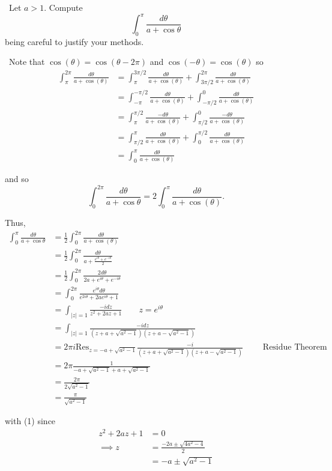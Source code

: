 \documentclass[12pt]{Homework}
\newcommand{\res}{\text{Res}}
\begin{document}
\begin{problem} $\,$
Let $a>1$. Compute $$\int_0^\pi\frac{d\theta}{a+\cos\theta}$$ being careful to justify your methods.
\end{problem}


\begin{solution}$\,$
Note that $\cos(\theta)=\cos(\theta-2\pi)$ and $\cos(-\theta)=\cos(\theta)$ so \begin{align*}
   \int_\pi^{2\pi}\frac{d\theta}{a+\cos(\theta)}&=\int_\pi^{3\pi/2}\frac{d\theta}{a+\cos(\theta)}+\int_{3\pi/2}^{2\pi}\frac{d\theta}{a+\cos(\theta)}\\
   &=\int_{-\pi}^{-\pi/2}\frac{d\theta}{a+\cos(\theta)}+\int_{-\pi/2}^0\frac{d\theta}{a+\cos(\theta)}\\
   &=\int_{\pi}^{\pi/2}\frac{-d\theta}{a+\cos(\theta)}+\int_{\pi/2}^0\frac{-d\theta}{a+\cos(\theta)}\\
   &=\int_{\pi/2}^{\pi}\frac{d\theta}{a+\cos(\theta)}+\int_0^{\pi/2}\frac{d\theta}{a+\cos(\theta)}\\
   &=\int_0^{\pi}\frac{d\theta}{a+\cos(\theta)}
\end{align*}

and so $$\int_0^{2\pi}\frac{d\theta}{a+\cos\theta}=2\int_0^\pi\frac{d\theta}{a+\cos(\theta)}.$$

Thus, \begin{align*}
    \int_0^\pi\frac{d\theta}{a+\cos\theta}&=\frac{1}{2}\int_0^{2\pi}\frac{d\theta}{a+\cos(\theta)}\\
    &=\frac{1}{2}\int_0^{2\pi}\frac{d\theta}{a+\frac{e^{i\theta}+e^{-i\theta}}{2}}\\
    &=\frac{1}{2}\int_0^{2\pi}\frac{2d\theta}{2a+e^{i\theta}+e^{-i\theta}}\\
    &=\int_0^{2\pi}\frac{e^{i\theta}d\theta}{e^{2i\theta}+2ae^{i\theta}+1}\\
    &=\int_{|z|=1}\frac{-idz}{z^2+2az+1}\qquad z=e^{i\theta}\\
    &=\int_{|z|=1}\frac{-idz}{(z+a+\sqrt{a^2-1})(z+a-\sqrt{a^2-1})}\tag{1}\\
    &=2\pi i\res_{z=-a+\sqrt{a^2-1}}\frac{-i}{(z+a+\sqrt{a^2-1})(z+a-\sqrt{a^2-1})}\qquad\text{ Residue Theorem }\tag{2}\\
    &=2\pi\frac{1}{-a+\sqrt{a^2-1}+a+\sqrt{a^2-1}}\\
    &=\frac{2\pi}{2\sqrt{a^2-1}}\\
    &=\frac{\pi}{\sqrt{a^2-1}}
\end{align*}

with (1) since \begin{align*}
    z^2+2az+1&=0\\
    \implies z&=\frac{-2a\pm\sqrt{4a^2-4}}{2}\\
    &=-a\pm\sqrt{a^2-1}
\end{align*}


\end{solution}
\end{document}
